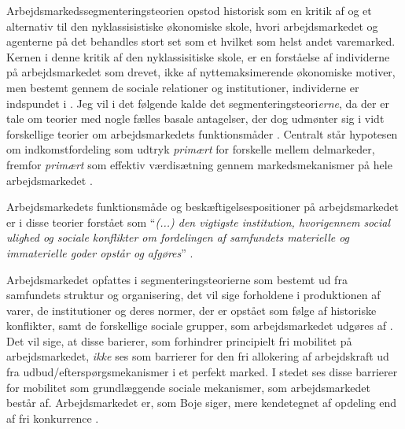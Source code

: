 Arbejdsmarkedssegmenteringsteorien opstod historisk som en kritik af og et alternativ til den nyklassisistiske økonomiske skole, hvori arbejdsmarkedet og agenterne på det behandles stort set som et hvilket som helst andet varemarked. Kernen i denne kritik af den nyklassisitiske skole, er en forståelse af individerne på arbejdsmarkedet som drevet, ikke af nyttemaksimerende økonomiske motiver, men bestemt gennem de sociale relationer og institutioner, individerne er indspundet i \parencite[173]{Boje1986}. Jeg vil i det følgende kalde det segmenteringsteori\emph{erne}, da der er tale om teorier med nogle fælles basale antagelser, der dog udmønter sig i vidt forskellige teorier om arbejdsmarkedets funktionsmåder \parencite[177]{Edwards1979}.  Centralt står hypotesen om indkomstfordeling som udtryk \emph{primært} for forskelle mellem delmarkeder, fremfor \emph{primært} som effektiv værdisætning gennem markedsmekanismer på hele arbejdsmarkedet \parencite[78]{BojeToft1989}.

Arbejdsmarkedets funktionsmåde og beskæftigelsespositioner på arbejdsmarkedet er i disse teorier forstået som “\emph{(...) den vigtigste institution, hvorigennem social ulighed og sociale konflikter om fordelingen af samfundets materielle og immaterielle goder opstår og afgøres}” \parencite[10]{Boje1985}. 

Arbejdsmarkedet opfattes i segmenteringsteorierne som bestemt ud fra samfundets struktur og organisering, det vil sige forholdene i produktionen af varer, de institutioner og deres normer, der er opstået som følge af historiske konflikter, samt de forskellige sociale grupper, som arbejdsmarkedet udgøres af \parencite[9]{Boje1985}. Det  vil sige, at disse barierer, som forhindrer principielt fri mobilitet på arbejdsmarkedet, \emph{ikke} ses som barrierer for den fri allokering af arbejdskraft ud fra udbud/efterspørgsmekanismer i et perfekt marked. I stedet ses disse barrierer for mobilitet som grundlæggende sociale mekanismer, som arbejdsmarkedet består af. Arbejdsmarkedet er, som Boje siger, mere kendetegnet af opdeling end af fri konkurrence \parencite[8]{Boje1985}. 

